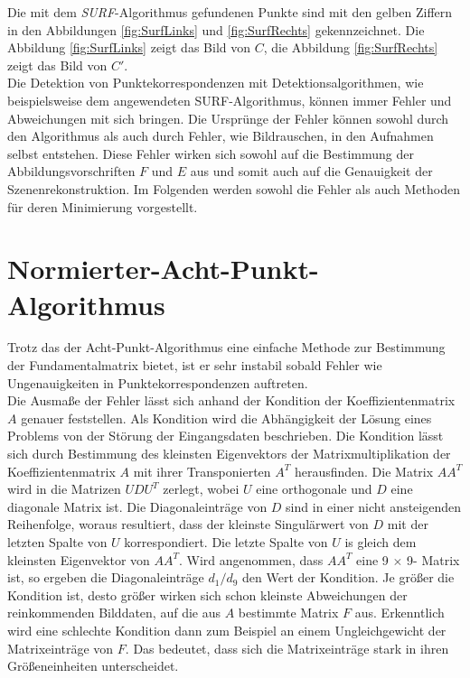 Die mit dem \textit{SURF}-Algorithmus gefundenen Punkte sind mit den gelben Ziffern in den Abbildungen \ref{fig:SurfLinks} und \ref{fig:SurfRechts} gekennzeichnet. Die Abbildung \ref{fig:SurfLinks} zeigt das Bild von $C$, die Abbildung \ref{fig:SurfRechts} zeigt das Bild von $C'$.\\

Die Detektion von Punktekorrespondenzen mit Detektionsalgorithmen, wie beispielsweise dem angewendeten SURF-Algorithmus, können immer Fehler und Abweichungen mit sich bringen. Die Ursprünge der Fehler können sowohl durch den Algorithmus als auch durch Fehler, wie Bildrauschen, in den Aufnahmen selbst entstehen. Diese Fehler wirken sich sowohl auf die Bestimmung der Abbildungsvorschriften $F$ und $E$ aus und somit auch auf die Genauigkeit der Szenenrekonstruktion\cite{HZ}. Im Folgenden werden sowohl die Fehler als auch Methoden für deren Minimierung vorgestellt.

\section{Normierter-Acht-Punkt-Algorithmus}

Trotz das der Acht-Punkt-Algorithmus eine einfache Methode zur Bestimmung der Fundamentalmatrix bietet, ist er sehr instabil sobald Fehler wie Ungenauigkeiten in Punktekorrespondenzen  auftreten\cite{HZ,Brooks}.\\

Die Ausmaße der Fehler lässt sich anhand der Kondition der Koeffizientenmatrix $A$ genauer feststellen. Als Kondition wird die Abhängigkeit der Lösung eines Problems von der Störung der Eingangsdaten beschrieben\cite{HZ8,ConditionNumber,Manocha}. Die Kondition lässt sich durch Bestimmung des kleinsten Eigenvektors der Matrixmultiplikation der Koeffizientenmatrix $A$ mit ihrer Transponierten $A^T$ herausfinden. Die Matrix $AA^T$ wird in die Matrizen $UDU^T$ zerlegt, wobei $U$ eine orthogonale und $D$ eine diagonale Matrix ist. Die Diagonaleinträge von $D$ sind in einer nicht ansteigenden Reihenfolge, woraus resultiert, dass der kleinste Singulärwert von $D$ mit der letzten Spalte von $U$ korrespondiert. Die letzte Spalte von $U$ is gleich dem kleinsten Eigenvektor von $AA^T$\cite{HZ8,ConditionNumber}. Wird angenommen, dass $AA^T$ eine 9 $\times$ 9- Matrix ist, so ergeben die Diagonaleinträge $d_1/d_9$ den Wert der Kondition. Je größer die Kondition ist, desto größer wirken sich schon kleinste Abweichungen der reinkommenden Bilddaten, auf die aus $A$ bestimmte Matrix $F$ aus. Erkenntlich wird eine schlechte Kondition dann zum Beispiel an einem Ungleichgewicht der Matrixeinträge von $F$\cite{HZ8}. Das bedeutet, dass sich die Matrixeinträge stark in ihren Größeneinheiten unterscheidet. \\

